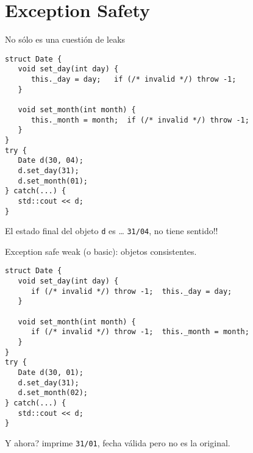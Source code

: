 \section{Exception Safety}
\begin{frame}[fragile]{No s\'olo es una cuesti\'on de leaks}
   \begin{lstlisting}[style=normal]
struct Date {
   void set_day(int day) {
      this._day = day;   if (/* invalid */) throw -1;
   }

   void set_month(int month) {
      this._month = month;  if (/* invalid */) throw -1;
   }
}
try {
   Date d(30, 04);
   d.set_day(31);
   d.set_month(01);
} catch(...) {
   std::cout << d;
}
   \end{lstlisting}
El estado final del objeto \lstinline[style=normal]!d! es \dots
\pause
\lstinline[style=normal]!31/04!, no tiene sentido!!
\end{frame}

\begin{frame}[fragile]{Exception safe weak (o basic): objetos consistentes.}
   \begin{lstlisting}[style=normal]
struct Date {
   void set_day(int day) {
      if (/* invalid */) throw -1;  this._day = day;  
   }

   void set_month(int month) {
      if (/* invalid */) throw -1;  this._month = month; 
   }
}
try {
   Date d(30, 01);
   d.set_day(31);
   d.set_month(02);
} catch(...) {
   std::cout << d;
}
   \end{lstlisting}
Y ahora?
\pause
imprime \lstinline[style=normal]!31/01!, fecha v\'alida pero no es la original.
\end{frame}

